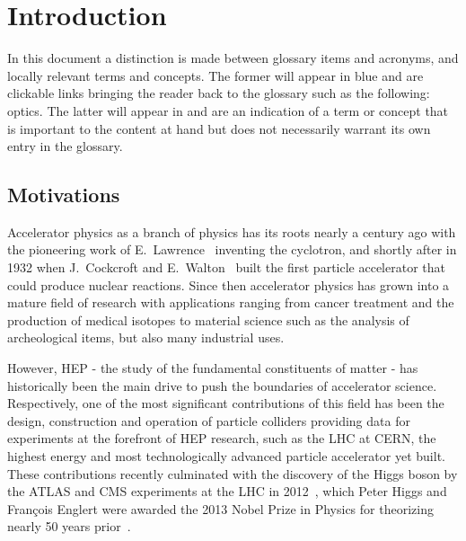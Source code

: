 \chapter{Introduction}
\label{chapter:introduction}

\begin{noteblock}
    In this document a distinction is made between glossary items and acronyms, and locally relevant terms and concepts.
    The former will appear in \textcolor{cern}{blue} and are clickable links bringing the reader back to the glossary such as the following: \gls{optics}.
    The latter will appear in  and are an indication of a term or concept that is important to the content at hand but does not necessarily warrant its own entry in the glossary.
\end{noteblock}

\section{Motivations}

Accelerator physics as a branch of physics has its roots nearly a century ago with the pioneering work of E.~Lawrence~\cite{PR:Lawrence:Production_High_Speed_Light_Ions} inventing the cyclotron, and shortly after in \num{1932} when J.~Cockcroft and E.~Walton~\cite{LLC:Cockcroft:Disintegration_Lithium_Swift_Protons,TRS:Cockcroft:Experiments_High_Velocity_Positive_Ions_1,TRS:Cockcroft:Experiments_High_Velocity_Positive_Ions_2} built the first particle accelerator that could produce nuclear reactions.
Since then accelerator physics has grown into a mature field of research with applications ranging from cancer treatment and the production of medical isotopes to material science such as the analysis of archeological items, but also many industrial uses.

However, \gls{HEP} - the study of the fundamental constituents of matter - has historically been the main drive to push the boundaries of accelerator science.
Respectively, one of the most significant contributions of this field has been the design, construction and operation of particle colliders providing data for experiments at the forefront of \gls{HEP} research, such as the \gls{LHC} at \acrshort{CERN}, the highest energy and most technologically advanced particle accelerator yet built.
These contributions recently culminated with the discovery of the Higgs boson by the \acrshort{ATLAS} and \acrshort{CMS} experiments at the \acrshort{LHC} in \num{2012}~\cite{PLB:ATLAS:Observation_Higgs_Boson, PLB:CMS:Observation_Higgs_Boson}, which Peter Higgs and François Englert were awarded the \num{2013} Nobel Prize in Physics for theorizing nearly \num{50} years prior~\cite{PRL:Higgs:Broken_Symmetries_Masses_Gauge_Bosons,PRL:Englert:Broken_Symmetry_Mass_Gauge_Vector_Mesons}.

